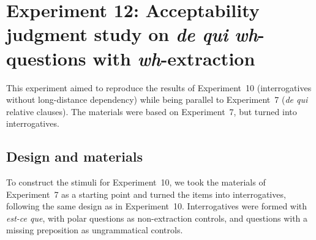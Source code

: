 \section[head=Experiment 12]{Experiment 12: Acceptability judgment study on \emph{de qui} \emph{wh}-questions with \emph{wh}-extraction}


This experiment aimed to reproduce the results of Experiment~10 (interrogatives without long-distance dependency) while being parallel to Experiment~7 (\emph{de qui} relative clauses). The materials were based on Experiment~7, but turned into interrogatives. 

\subsection{Design and materials}

To construct the stimuli for Experiment~10, we took the materials of Experiment~7 as a starting point and turned the items into interrogatives, following the same design as in Experiment~10. Interrogatives were formed with \emph{est-ce que}, with polar questions as non-extraction controls, and questions with a missing preposition as ungrammatical controls. 

